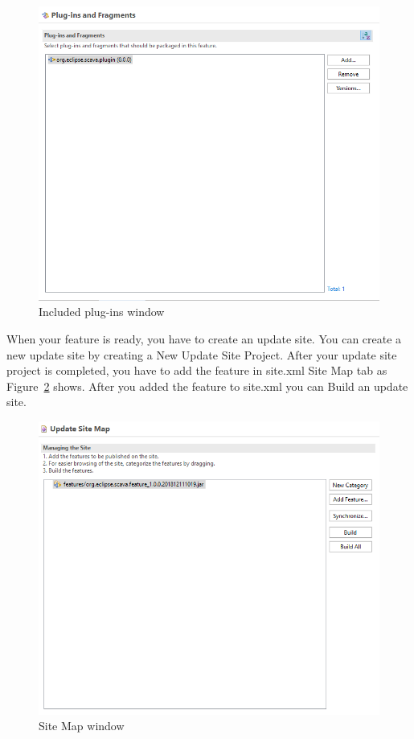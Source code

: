 \documentclass[11pt,a4paper]{book}
\begin{document}
\begin{figure}[!h]
	\centering
	\includegraphics[width=\linewidth]{pic/feature.png}
	\caption{Included plug-ins window}
	\label{fig:feature}
\end{figure}

When your feature is ready, you have to create an update site. You can create a new update site by creating a New Update Site Project. After your update site project is completed, you have to add the feature in site.xml Site Map tab as Figure~\ref{fig:update} shows. After you added the feature to site.xml you can Build an update site.


\begin{figure}[!h]
	\centering
	\includegraphics[width=\linewidth]{pic/update_site.png}
	\caption{Site Map window}
	\label{fig:update}
\end{figure}
\end{document}
